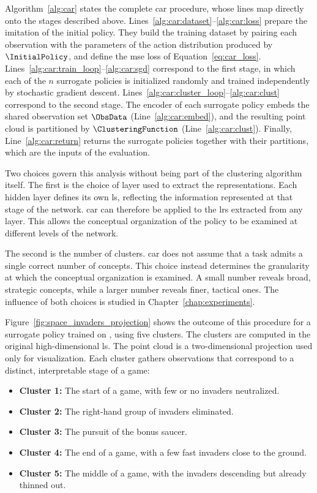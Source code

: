 Algorithm~\ref{alg:car} states the complete \gls{car} procedure, whose lines map directly onto the stages described above.
Lines~\ref{alg:car:dataset}--\ref{alg:car:loss} prepare the imitation of the initial policy.
They build the training dataset by pairing each observation with the parameters of the action distribution produced by $\InitialPolicy$, and define the \gls{mse} loss of Equation~\eqref{eq:car_loss}.
Lines~\ref{alg:car:train_loop}--\ref{alg:car:sgd} correspond to the first stage, in which each of the $n$ surrogate policies is initialized randomly and trained independently by stochastic gradient descent.
Lines~\ref{alg:car:cluster_loop}--\ref{alg:car:clust} correspond to the second stage.
The encoder of each surrogate policy embeds the shared observation set $\ObsData$ (Line~\ref{alg:car:embed}), and the resulting point cloud is partitioned by $\ClusteringFunction$ (Line~\ref{alg:car:clust}).
Finally, Line~\ref{alg:car:return} returns the surrogate policies together with their partitions, which are the inputs of the evaluation.



Two choices govern this analysis without being part of the clustering algorithm itself.
The first is the choice of layer used to extract the representations.
Each hidden layer defines its own \gls{ls}, reflecting the information represented at that stage of the network.
\gls{car} can therefore be applied to the \glspl{lr} extracted from any layer.
This allows the conceptual organization of the policy to be examined at different levels of the network.

The second is the number of clusters.
\gls{car} does not assume that a task admits a single correct number of concepts.
This choice instead determines the granularity at which the conceptual organization is examined.
A small number reveals broad, strategic concepts, while a larger number reveals finer, tactical ones.
The influence of both choices is studied in Chapter~\ref{chap:experiments}.


Figure~\ref{fig:space_invaders_projection} shows the outcome of this procedure for a surrogate policy trained on \SpaceInvadersName, using five clusters.
The clusters are computed in the original high-dimensional \gls{ls}.
The point cloud is a two-dimensional projection used only for visualization.
Each cluster gathers observations that correspond to a distinct, interpretable stage of a game:
\begin{itemize}
    \item \textbf{Cluster 1:} The start of a game, with few or no invaders neutralized.
    \item \textbf{Cluster 2:} The right-hand group of invaders eliminated.
    \item \textbf{Cluster 3:} The pursuit of the bonus saucer.
    \item \textbf{Cluster 4:} The end of a game, with a few fast invaders close to the ground.
    \item \textbf{Cluster 5:} The middle of a game, with the invaders descending but already thinned out.
\end{itemize}


